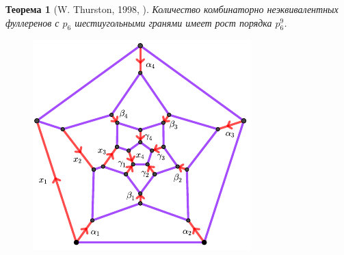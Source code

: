 \documentclass[14pt, dvipsnames, twoside]{extarticle}
\newtheorem{theorem}{Теорема}
\theoremstyle{definition}
\theoremstyle{remark}
\begin{document}
\begin{theorem}[W. Thurston, 1998, \cite{Thurston}]
Количество комбинаторно неэквивалентных фуллеренов с $p_6$ шестиугольными гранями имеет рост порядка $p_6^9$.
\end{theorem}
 








\begin{figure}
\begin{center}
\includegraphics[scale=1.9]{Fullerene}
\caption{}\label{pict_fullerene}
\end{center} 
\end{figure}
\end{document}
